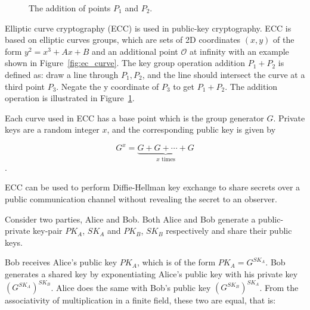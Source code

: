 \documentclass[final,dissertation.tex]{subfiles}
\begin{document}
\begin{figure}[!h]
\centering
{}
\caption{The addition of points $P_1$ and $P_2$.}
\label{fig:ec_addition}
\end{figure}

Elliptic curve cryptography (ECC) is used in public-key cryptography. ECC is based on elliptic curves groups, which are sets of 2D coordinates $(x, y)$ of the form $y^2 = x^3 + Ax + B$ and an additional point $\mathcal{O}$ at infinity with an example shown in Figure~\ref{fig:ec_curve}. The key group operation addition $P_1 + P_2$ is defined as: draw a line through $P_1, P_2$, and the line should intersect the curve at a third point $P_3$. Negate the y coordinate of $P_3$ to get $P_1 + P_2$. The addition operation is illustrated in Figure~\ref{fig:ec_addition}.

Each curve used in ECC has a base point which is the group generator $G$. Private keys are a random integer $x$, and the corresponding public key is given by 

$$G^x = \underbrace{G + G + \cdots + G}_{x \text{ times}}$$.

ECC can be used to perform Diffie-Hellman key exchange to share secrets over a public communication channel without revealing the secret to an observer.

Consider two parties, Alice and Bob. Both Alice and Bob generate a public-private key-pair $PK_A$, $SK_A$ and $PK_B$, $SK_B$ respectively and share their public keys.

Bob receives Alice's public key $PK_A$, which is of the form $PK_A = G^{SK_A}$. Bob generates a shared key by exponentiating Alice's public key with his private key $(G^{SK_A})^{SK_B}$. Alice does the same with Bob's public key $(G^{SK_B})^{SK_A}$. From the associativity of multiplication in a finite field, these two are equal, that is:
\end{document}
